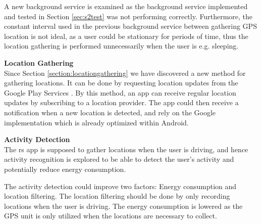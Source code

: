 A new background service is examined as the background service implemented and tested in Section \ref{sec:s2test} was not performing correctly.
Furthermore, the constant interval used in the previous background service between gathering GPS location is not ideal, as a user could be stationary for periods of time, thus the location gathering is performed unnecessarily when the user is e.g. sleeping.

\textbf{Location Gathering}\\
Since Section \ref{section:locationgathering} we have discovered a new method for gathering locations. 
It can be done by requesting location updates from the Google Play Services \cite{receivingLocationUpdates}.
By this method, an app can receive regular location updates by subscribing to a location provider.
The app could then receive a notification when a new location is detected, and rely on the Google implementation which is already optimized within Android.

\textbf{Activity Detection}\\
The \gls{rs} app is supposed to gather locations when the user is driving, and hence activity recognition is explored to be able to detect the user's activity and potentially reduce energy consumption.

The activity detection could improve two factors: Energy consumption and location filtering.
The location filtering should be done by only recording locations when the user is driving.
The energy consumption is lowered as the GPS unit is only utilized when the locations are necessary to collect.
